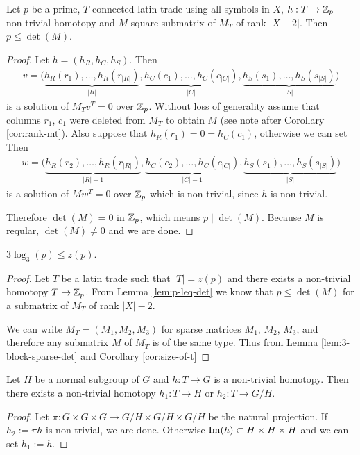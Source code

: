 \begin{lem}
\label{lem:p-leq-det}
Let $p$ be a prime, $T$ connected latin trade using all symbols in $X$, $h: T \rightarrow \mathbb Z_p$ non-trivial homotopy and $M$  square submatrix of $M_T$ of rank $|X-2|$. Then $p \leq \det(M)$.
\end{lem}
\begin{proof}
Let $h = (h_R,h_C,h_S)$. Then
\begin{align*}
	v = \big(\underbrace{h_R(r_1), \dots, h_R(r_{|R|})}_{|R|},\underbrace{h_C(c_1), \dots, h_C(c_{|C|})}_{|C|}, \underbrace{h_S(s_1), \dots, h_S(s_{|S|})}_{|S|}\big)
\end{align*}
is a solution of $M_Tv^T = 0$ over $\mathbb Z_p$. Without loss of generality assume that columns $r_1$, $c_1$ were deleted from $M_T$ to obtain $M$ (see note after Corollary \ref{cor:rank-mt}). Also suppose that $h_R(r_1) = 0 = h_C(c_1)$, otherwise we can set
%
Then
\begin{align*}
	w = \big(\underbrace{h_R(r_2), \dots, h_R(r_{|R|})}_{|R|-1},\underbrace{h_C(c_2), \dots, h_C(c_{|C|})}_{|C|-1}, \underbrace{h_S(s_1), \dots, h_S(s_{|S|})}_{|S|}\big)
\end{align*}
is a solution of $Mw^T = 0$ over $\mathbb Z_p$ which is non-trivial, since $h$ is non-trivial.

Therefore $\det(M) = 0$ in $\mathbb Z_p$, which means $p \mid \det(M)$. Because $M$ is reqular, $\det(M) \ne 0$ and we are done.
\end{proof}

\begin{lem}
\label{lem:lower-bound-zp}
$3 \log_3(p) \leq z(p)$.
\end{lem}%
\begin{proof}
Let $T$ be a latin trade such that $|T| = z(p)$ and there exists a non-trivial homotopy $T \rightarrow \mathbb Z_p$. From Lemma \ref{lem:p-leq-det} we know that $p \leq \det(M)$ for a submatrix of $M_T$ of rank $|X|-2$.

We can write $M_T = (M_1, M_2, M_3)$ for sparse matrices $M_1$, $M_2$, $M_3$, and therefore any submatrix $M$ of $M_T$ is of the same type. Thus from Lemma \ref{lem:3-block-sparse-det} and Corollary \ref{cor:size-of-t}
%
\end{proof}

\begin{lem}
\label{lem:nontrivial-homotopy-normal-subgroup}
Let $H$ be a normal subgroup of $G$ and $h: T \rightarrow G$ is a non-trivial homotopy. Then there exists a non-trivial homotopy $h_1: T \rightarrow H$ or $h_2: T \rightarrow G/H$.
\end{lem}
\begin{proof}
Let $\pi: G \times G \times G \rightarrow G/H \times G/H \times G/H$ be the natural projection. If $h_2 := \pi h$ is non-trivial, we are done. Otherwise $\mathop{\mathrm{Im}}(h) \subset H \times H \times H$ and we can set $h_1 := h$.
\end{proof}

